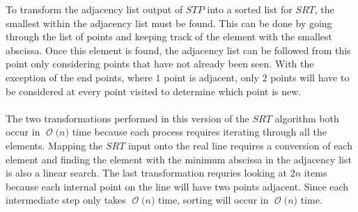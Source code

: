 \documentclass[12pt]{article}
\newcommand{\BigO}[1]{\ensuremath{\operatorname{\mathcal{O}}\bigl(#1\bigr)}}
\begin{document}
To transform the adjacency list output of $STP$ into a sorted list for $SRT$, the
smallest within the adjacency list must be found.  This can be done by going through 
the list of points and keeping track of the element with the smallest abscissa.  Once
this element is found, the adjacency list can be followed from this point only
considering points that have not already been seen.  With the exception of the 
end points, where $1$ point is adjacent, only $2$ points will have to be considered
at every point visited to determine which point is new.\\\\
The two transformations performed in this version of the $SRT$ algorithm both 
occur in \BigO{n} time because each process requires iterating through all the elements.
Mapping the $SRT$ input onto the real line requires a conversion of each element and 
finding the element with the minimum abscissa in the adjacency list is also a linear
search.  The last transformation requries looking at $2n$ items because each internal
point on the line will have two points adjacent.  Since each intermediate step only takes
\BigO{n} time, sorting will occur in \BigO{n} time. 
\end{document}

